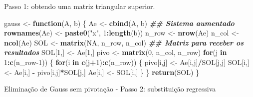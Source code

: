 \documentclass[
]{article}
\newenvironment{Shaded}{\begin{snugshade}}{\end{snugshade}}
\newcommand{\ConstantTok}[1]{\textcolor[rgb]{0.56,0.35,0.01}{#1}}
\newcommand{\ControlFlowTok}[1]{\textcolor[rgb]{0.13,0.29,0.53}{\textbf{#1}}}
\newcommand{\DecValTok}[1]{\textcolor[rgb]{0.00,0.00,0.81}{#1}}
\newcommand{\DocumentationTok}[1]{\textcolor[rgb]{0.56,0.35,0.01}{\textbf{\textit{#1}}}}
\newcommand{\FunctionTok}[1]{\textcolor[rgb]{0.13,0.29,0.53}{\textbf{#1}}}
\newcommand{\NormalTok}[1]{#1}
\newcommand{\OtherTok}[1]{\textcolor[rgb]{0.56,0.35,0.01}{#1}}
\newcommand{\SpecialCharTok}[1]{\textcolor[rgb]{0.81,0.36,0.00}{\textbf{#1}}}
\newcommand{\StringTok}[1]{\textcolor[rgb]{0.31,0.60,0.02}{#1}}
\begin{document}
Passo 1: obtendo uma matriz triangular superior.

\begin{Shaded}
\begin{Highlighting}[]
\NormalTok{gauss }\OtherTok{\textless{}{-}} \ControlFlowTok{function}\NormalTok{(A, b) \{}
\NormalTok{Ae }\OtherTok{\textless{}{-}} \FunctionTok{cbind}\NormalTok{(A, b) }\DocumentationTok{\#\# Sistema aumentado}
\FunctionTok{rownames}\NormalTok{(Ae) }\OtherTok{\textless{}{-}} \FunctionTok{paste0}\NormalTok{(}\StringTok{"x"}\NormalTok{, }\DecValTok{1}\SpecialCharTok{:}\FunctionTok{length}\NormalTok{(b))}
\NormalTok{n\_row }\OtherTok{\textless{}{-}} \FunctionTok{nrow}\NormalTok{(Ae)}
\NormalTok{n\_col }\OtherTok{\textless{}{-}} \FunctionTok{ncol}\NormalTok{(Ae)}
\NormalTok{SOL }\OtherTok{\textless{}{-}} \FunctionTok{matrix}\NormalTok{(}\ConstantTok{NA}\NormalTok{, n\_row, n\_col) }\DocumentationTok{\#\# Matriz para receber os resultados}
\NormalTok{SOL[}\DecValTok{1}\NormalTok{,] }\OtherTok{\textless{}{-}}\NormalTok{ Ae[}\DecValTok{1}\NormalTok{,]}
\NormalTok{pivo }\OtherTok{\textless{}{-}} \FunctionTok{matrix}\NormalTok{(}\DecValTok{0}\NormalTok{, n\_col, n\_row)}
\ControlFlowTok{for}\NormalTok{(j }\ControlFlowTok{in} \DecValTok{1}\SpecialCharTok{:}\FunctionTok{c}\NormalTok{(n\_row}\DecValTok{{-}1}\NormalTok{)) \{}
\ControlFlowTok{for}\NormalTok{(i }\ControlFlowTok{in} \FunctionTok{c}\NormalTok{(j}\SpecialCharTok{+}\DecValTok{1}\NormalTok{)}\SpecialCharTok{:}\FunctionTok{c}\NormalTok{(n\_row)) \{}
\NormalTok{pivo[i,j] }\OtherTok{\textless{}{-}}\NormalTok{ Ae[i,j]}\SpecialCharTok{/}\NormalTok{SOL[j,j]}
\NormalTok{SOL[i,] }\OtherTok{\textless{}{-}}\NormalTok{ Ae[i,] }\SpecialCharTok{{-}}\NormalTok{ pivo[i,j]}\SpecialCharTok{*}\NormalTok{SOL[j,]}
\NormalTok{Ae[i,] }\OtherTok{\textless{}{-}}\NormalTok{ SOL[i,]}
\NormalTok{\}}
\NormalTok{\}}
\FunctionTok{return}\NormalTok{(SOL)}
\NormalTok{\}}
\end{Highlighting}
\end{Shaded}

Eliminação de Gauss sem pivotação - Passo 2: substituição regressiva
\end{document}
